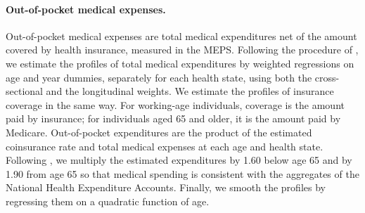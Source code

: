 \begin{table}[!htbp]
\centering
\caption{Estimated Coefficients of the Survival Model}\label{tab:survival}
\small

\end{table}

\paragraph{Out-of-pocket medical expenses.} Out-of-pocket medical expenses are total medical expenditures net of the amount covered by health insurance, measured in the MEPS. Following the procedure of \citet{Pashchenko2019}, we estimate the profiles of total medical expenditures by weighted regressions on age and year dummies, separately for each health state, using both the cross-sectional and the longitudinal weights. We estimate the profiles of insurance coverage in the same way. For working-age individuals, coverage is the amount paid by insurance; for individuals aged 65 and older, it is the amount paid by Medicare. Out-of-pocket expenditures are the product of the estimated coinsurance rate and total medical expenses at each age and health state. Following \citet{Denardi2018}, we multiply the estimated expenditures by 1.60 below age 65 and by 1.90 from age 65 so that medical spending is consistent with the aggregates of the National Health Expenditure Accounts. %
Finally, we smooth the profiles by regressing them on a quadratic function of age.

